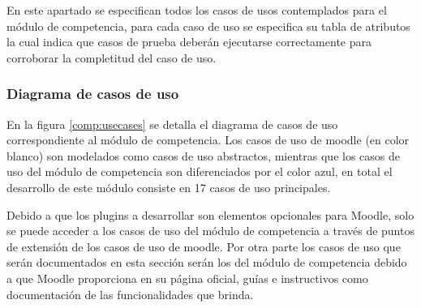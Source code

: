  En este apartado se especifican todos los casos de usos contemplados para el módulo de
competencia, para cada caso de uso se especifica su tabla de atributos la cual indica que casos
 de prueba deberán ejecutarse correctamente para corroborar la completitud del caso de uso.

\subsubsection*{Diagrama de casos de uso}

 En la figura \ref{comp:usecases} se detalla el diagrama de casos de uso correspondiente al módulo
 de competencia. Los casos de uso de moodle (en color blanco) son modelados como casos de uso
 abstractos, mientras que los casos de uso del módulo de competencia son diferenciados por el
 color azul, en total el desarrollo de este módulo consiste en 17 casos de uso principales.


 \noindent
 Debido a que los plugins a desarrollar son elementos opcionales para Moodle, solo se puede
 acceder a los casos de uso del módulo de competencia a través de puntos de extensión de los
 casos de uso de moodle. Por otra parte los casos de uso que serán documentados en esta sección
 serán los del módulo de competencia debido a que Moodle proporciona en su página oficial, guías
 e instructivos como documentación de las funcionalidades que brinda.











